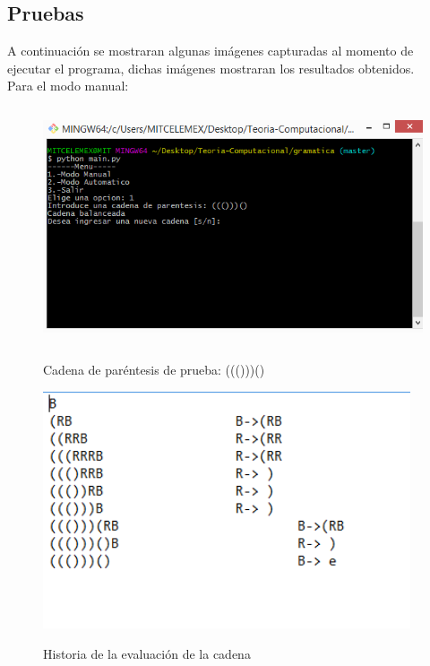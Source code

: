 \subsection{Pruebas}
A continuaci\'on se mostraran algunas im\'agenes capturadas al momento de ejecutar el programa, dichas im\'agenes mostraran los resultados obtenidos.\\
\vspace{1.0cm}
Para el modo manual:\\
\begin{figure}[H]
\includegraphics[width=\textwidth, height=7cm]{ModoManualPare.png}
\label{fig:manual_webay}
\caption{Cadena de par\'entesis de prueba: ((()))()}
\end{figure}

\begin{figure}[H]
\includegraphics[width=\textwidth, height=7cm]{ArchivoPare.png}
\label{fig:manualtexto_alfabeto}
\caption{Historia de la evaluaci\'on de la cadena}
\end{figure}

